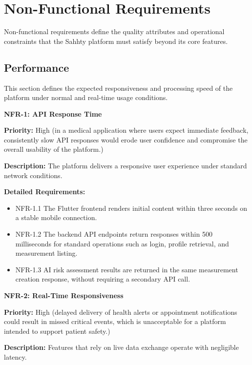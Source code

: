 \section{Non-Functional Requirements}

Non-functional requirements define the quality attributes and operational constraints that
the Sahhty platform must satisfy beyond its core features.

\subsection{Performance}

This section defines the expected responsiveness and processing speed of the platform
under normal and real-time usage conditions.

\textbf{NFR-1: API Response Time}

\textbf{Priority:} High (in a medical application where users expect immediate feedback, consistently slow API responses would erode user confidence and compromise the overall usability of the platform.)

\textbf{Description:} The platform delivers a responsive user experience under standard
network conditions.

\textbf{Detailed Requirements:}
\begin{itemize}
    \item NFR-1.1 \; The Flutter frontend renders initial content within three seconds
    on a stable mobile connection.
    \item NFR-1.2 \; The backend API endpoints return responses within
    500 milliseconds for standard operations such as login, profile retrieval, and
    measurement listing.
    \item NFR-1.3 \; AI risk assessment results are returned in the same measurement
    creation response, without requiring a secondary API call.
\end{itemize}

\medskip

\textbf{NFR-2: Real-Time Responsiveness}

\textbf{Priority:} High (delayed delivery of health alerts or appointment notifications could result in missed critical events, which is unacceptable for a platform intended to support patient safety.)

\textbf{Description:} Features that rely on live data exchange operate with negligible
latency.

